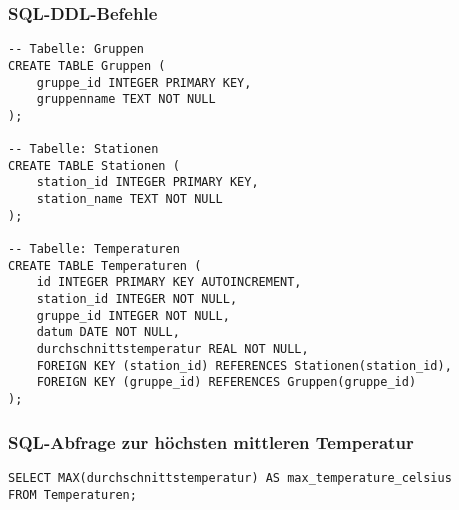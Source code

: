 \documentclass{article}
\begin{document}
\subsubsection{SQL-DDL-Befehle}
\begin{verbatim}
-- Tabelle: Gruppen
CREATE TABLE Gruppen (
    gruppe_id INTEGER PRIMARY KEY,
    gruppenname TEXT NOT NULL
);

-- Tabelle: Stationen
CREATE TABLE Stationen (
    station_id INTEGER PRIMARY KEY,
    station_name TEXT NOT NULL
);

-- Tabelle: Temperaturen
CREATE TABLE Temperaturen (
    id INTEGER PRIMARY KEY AUTOINCREMENT,
    station_id INTEGER NOT NULL,
    gruppe_id INTEGER NOT NULL,
    datum DATE NOT NULL,
    durchschnittstemperatur REAL NOT NULL,
    FOREIGN KEY (station_id) REFERENCES Stationen(station_id),
    FOREIGN KEY (gruppe_id) REFERENCES Gruppen(gruppe_id)
);
\end{verbatim}

\subsubsection{SQL-Abfrage zur höchsten mittleren Temperatur}
\begin{verbatim}
SELECT MAX(durchschnittstemperatur) AS max_temperature_celsius
FROM Temperaturen;
\end{verbatim}

\newpage
\renewcommand{\refname}{Literatur}


\end{document}
